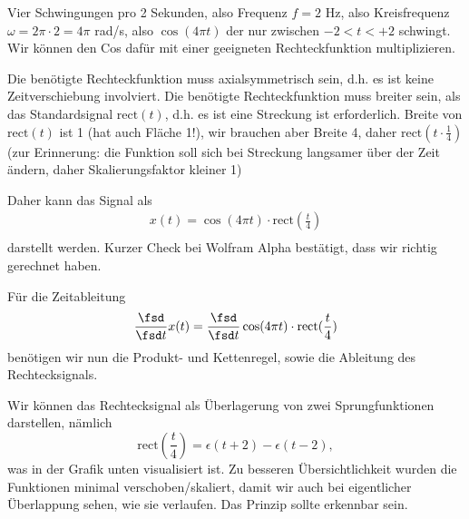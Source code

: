 \begin{ExCalc}
Vier Schwingungen pro 2 Sekunden, also Frequenz $f=2$ Hz, also Kreisfrequenz
$\omega=2\pi\cdot 2 = 4\pi$ rad/s, also $\cos(4\pi t)$ der nur zwischen
$-2 < t < +2$ schwingt. Wir können den Cos dafür mit einer geeigneten Rechteckfunktion
multiplizieren.

Die benötigte Rechteckfunktion muss axialsymmetrisch sein, d.h. es ist keine
Zeitverschiebung involviert.
Die benötigte Rechteckfunktion muss breiter sein, als das Standardsignal
$\mathrm{rect}(t)$, d.h. es ist eine Streckung ist erforderlich.
Breite von $\mathrm{rect}(t)$ ist 1 (hat auch Fläche 1!), wir brauchen aber
Breite 4, daher $\mathrm{rect}(t\cdot \frac{1}{4})$ (zur Erinnerung:
die Funktion soll sich bei Streckung langsamer über der Zeit ändern, daher
Skalierungsfaktor kleiner 1)

Daher kann das Signal als
\begin{align}
x(t) = \cos(4\pi t) \cdot \mathrm{rect}(\frac{t}{4})\\
\end{align}
darstellt werden. Kurzer Check bei Wolfram Alpha bestätigt, dass wir richtig
gerechnet haben.

Für die Zeitableitung
\begin{align}
\frac{\fsd }{\fsd t} x(t) =
\frac{\fsd }{\fsd t} \cos(4\pi t) \cdot \mathrm{rect}(\frac{t}{4})\\
\end{align}
benötigen wir nun die Produkt- und Kettenregel, sowie die Ableitung des Rechtecksignals.

Wir können das Rechtecksignal als Überlagerung von zwei Sprungfunktionen darstellen,
nämlich
\begin{equation}
\mathrm{rect}(\frac{t}{4}) = \epsilon(t+2) -\epsilon(t-2),
\end{equation}
was in der Grafik unten visualisiert ist. Zu besseren Übersichtlichkeit wurden die
Funktionen minimal verschoben/skaliert, damit wir auch bei eigentlicher
Überlappung sehen, wie sie verlaufen. Das Prinzip sollte erkennbar sein.
%
\begin{center}
\end{center}


\end{ExCalc}
